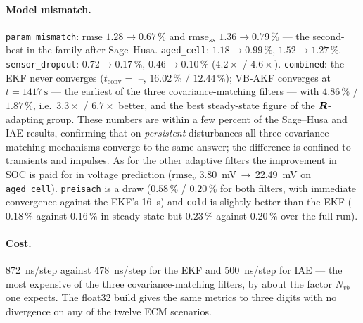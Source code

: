\paragraph{Model mismatch.}  \texttt{param\_mismatch}: $\mathrm{rmse}$ $1.28\to0.67\,\%$ and
$\mathrm{rmse}_{ss}$ $1.36\to0.79\,\%$ --- the second-best in the family after Sage--Husa.
\texttt{aged\_cell}: $1.18\to0.99\,\%$, $1.52\to1.27\,\%$.  \texttt{sensor\_dropout}:
$0.72\to0.17\,\%$, $0.46\to0.10\,\%$ ($4.2\times$ / $4.6\times$).  \texttt{combined}: the EKF never
converges ($t_\mathrm{conv}=$ --, $16.02\,\%$ / $12.44\,\%$); VB-AKF converges at
$t=\SI{1417}{\second}$ --- the earliest of the three covariance-matching filters --- with
$4.86\,\%$ / $\mathbf{1.87\,\%}$, i.e.\ $3.3\times$ / $6.7\times$ better, and the best steady-state
figure of the $\bm{R}$-adapting group.  These numbers are within a few percent of the Sage--Husa and IAE
results, confirming that on \emph{persistent} disturbances all three covariance-matching mechanisms
converge to the same answer; the difference is confined to transients and impulses.  As for the other
adaptive filters the improvement in SOC is paid for in voltage prediction ($\mathrm{rmse}_v$
\SI{3.80}{\milli\volt}\,$\to$\,\SI{22.49}{\milli\volt} on \texttt{aged\_cell}).  \texttt{preisach}
is a draw ($0.58\,\%$ / $0.20\,\%$ for both filters, with immediate convergence against the EKF's
\SI{16}{\second}) and \texttt{cold} is slightly better than the EKF ($0.18\,\%$ against $0.16\,\%$ in
steady state but $0.23\,\%$ against $0.20\,\%$ over the full run).

\paragraph{Cost.}  \SI{872}{\nano\second}/step against \SI{478}{\nano\second}/step for the EKF and
\SI{500}{\nano\second}/step for IAE --- the most expensive of the three covariance-matching filters,
by about the factor $N_{vb}$ one expects.  The float32 build gives the same metrics to three digits
with no divergence on any of the twelve ECM scenarios.


